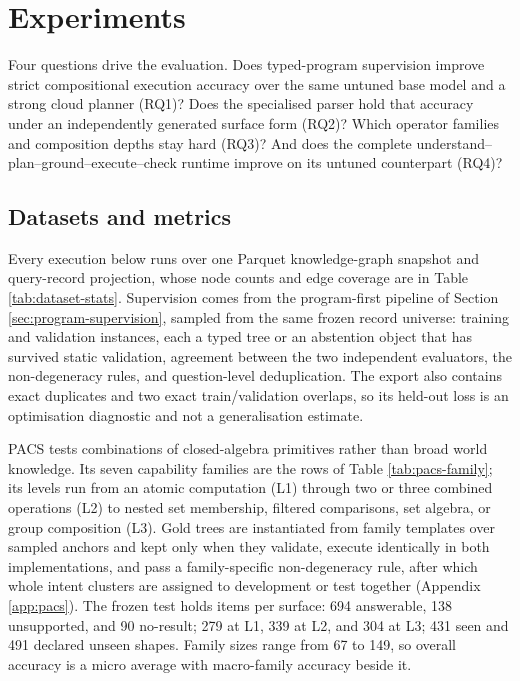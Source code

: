 \section{Experiments}
\label{sec:experiments}

Four questions drive the evaluation.  Does typed-program supervision improve strict compositional
execution accuracy over the same untuned base model and a strong cloud planner (RQ1)?  Does the
specialised parser hold that accuracy under an independently generated surface form (RQ2)?  Which
operator families and composition depths stay hard (RQ3)?  And does the complete
understand--plan--ground--execute--check runtime improve on its untuned counterpart (RQ4)?

\subsection{Datasets and metrics}
\label{sec:pacs-construction}

Every execution below runs over one Parquet knowledge-graph snapshot and query-record projection,
whose node counts and edge coverage are in Table \ref{tab:dataset-stats}.  Supervision comes from
the program-first pipeline of Section \ref{sec:program-supervision}, sampled from the same frozen
record universe: \TrainN training and \ValN validation instances, each a typed tree or an
abstention object that has survived static validation, agreement between the two independent
evaluators, the non-degeneracy rules, and question-level deduplication.  The export also contains
exact duplicates and two exact train/validation overlaps, so its held-out loss is an optimisation
diagnostic and not a generalisation estimate.

PACS tests combinations of closed-algebra primitives rather than broad world knowledge.  Its
seven capability families are the rows of Table \ref{tab:pacs-family}; its levels run from an
atomic computation (L1) through two or three combined operations (L2) to nested set membership,
filtered comparisons, set algebra, or group composition (L3).  Gold trees are instantiated from
family templates over sampled anchors and kept only when they validate, execute identically in
both implementations, and pass a family-specific non-degeneracy rule, after which whole intent
clusters are assigned to development or test together (Appendix \ref{app:pacs}).  The frozen test
holds \PacsN{} items per surface: 694 answerable, 138 unsupported, and 90 no-result; 279 at L1,
339 at L2, and 304 at L3; 431 seen and 491 declared unseen shapes.  Family sizes range from 67 to
149, so overall accuracy is a micro average with macro-family accuracy beside it.

